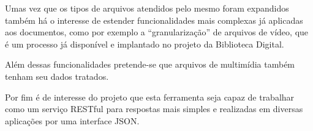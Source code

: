 Umas vez que os tipos de arquivos atendidos pelo mesmo foram expandidos também há o interesse de estender funcionalidades mais complexas já aplicadas aos documentos, como por exemplo a ``granularização'' de arquivos de vídeo, que é um processo já disponível e implantado no projeto da Biblioteca Digital.

Além dessas funcionalidades pretende-se que arquivos de multimídia também tenham seu dados tratados.

Por fim é de interesse do projeto que esta ferramenta seja capaz de trabalhar como um serviço RESTful para respostas mais simples e realizadas em diversas aplicações por uma interface JSON.
